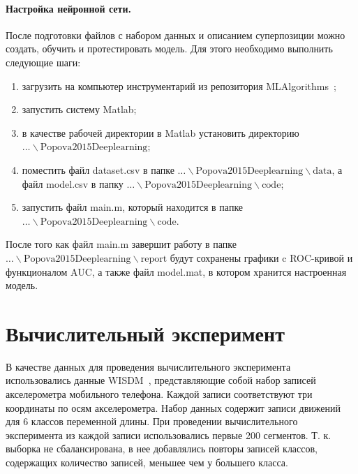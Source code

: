 \documentclass[12pt]{article}
\begin{document}
\paragraph{Настройка нейронной сети.} После подготовки файлов с набором данных и описанием суперпозиции можно создать, обучить и протестировать модель. Для этого необходимо выполнить следующие шаги:
\begin{enumerate}[1)]
\item загрузить на компьютер инструментарий из репозитория MLAlgorithms~\cite{source_popova};
\item запустить систему Matlab;
\item в качестве рабочей директории в Matlab установить директорию \\$\dots\backslash \text{Popova2015Deeplearning}$;
\item поместить файл dataset.csv в папке $\dots\backslash \text{Popova2015Deeplearning}\backslash \text{data}$, а файл model.csv в папку $\dots\backslash \text{Popova2015Deeplearning}\backslash \text{code}$;
\item запустить файл main.m, который находится в папке $\dots\backslash \text{Popova2015Deeplearning}\backslash \text{code}$.

\end{enumerate}

После того как файл main.m завершит работу в папке $\dots\backslash \text{Popova2015Deeplearning}\backslash \text{report}$ будут сохранены графики c ROC-кривой и функционалом AUC, а также файл model.mat, в котором хранится настроенная модель.


\section{Вычислительный эксперимент}
В качестве данных для проведения вычислительного эксперимента использовались данные WISDM~\cite{wisdm}, представляющие собой набор записей акселерометра мобильного телефона. Каждой записи соответствуют три координаты по осям акселерометра. Набор данных содержит записи движений для 6 классов переменной длины.
При проведении вычислительного эксперимента из каждой записи использовались первые 200 сегментов. Т. к. выборка не сбалансирована, в нее добавлялись повторы записей классов, содержащих количество записей, меньшее чем у большего класса.
\end{document}
